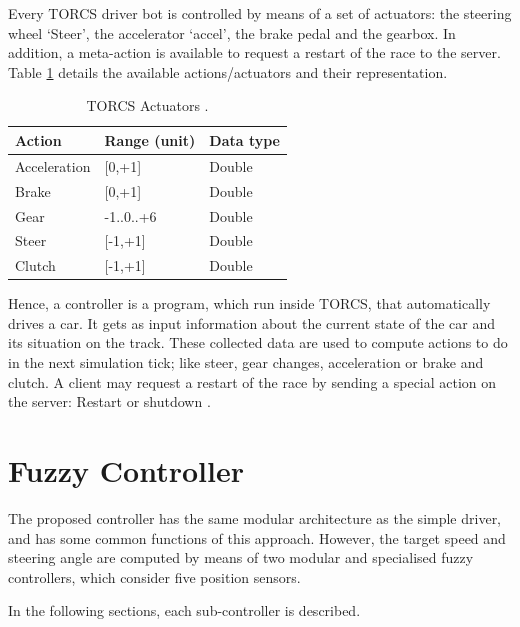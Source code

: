 \documentclass[runningheads,a4paper]{llncs}
\begin{document}
	Every TORCS driver bot is controlled by means of a set of actuators: the steering wheel `Steer', the accelerator `accel', the brake pedal and the gearbox. In addition, a meta-action is available to request a restart of the race to the server. Table \ref{tab2} details the available actions/actuators and their representation.
	
	\begin{table}[ht!]
		{\scriptsize
			{\centering
				\begin{tabular}{|p{3cm}|p{3 cm}|p{3 cm}|}
					\hline
					
					{\textbf{Action} }&
					{\textbf{Range} (unit)} &  
					{\textbf{Data type}}\\ 
					\hline
					Acceleration & [0,+1] & Double\\ 
					\hline
					Brake & [0,+1]	& Double\\
					\hline
					Gear & -1..0..+6	& Double\\
					\hline
					Steer & [-1,+1]	& Double\\
					\hline
					Clutch & [-1,+1]	& Double\\
					\hline
				\end{tabular}
			}
		}
		\caption{TORCS Actuators \cite{torcs2012}.}
		\label{tab2}
	\end{table}
	
	Hence, a controller is a program, which run inside TORCS, that automatically drives a car. It gets as input information about the current state of the car and its situation on the track. These collected data are used to compute actions to do in the next simulation tick; like steer, gear changes, acceleration or brake and clutch. A client may request a restart of the race by sending a special action on the server: Restart or shutdown \cite{manualTORCS}.
	
	
	\section{Fuzzy Controller}
	\label{sec:fuzzy_controller}
	
	The proposed controller has the same modular architecture as the simple driver, and has some common functions of this approach. 
	However, the target speed and steering angle are computed by means of two modular and specialised fuzzy controllers, which consider five position sensors.
	
	In the following sections, each sub-controller is described.
	
\end{document}
